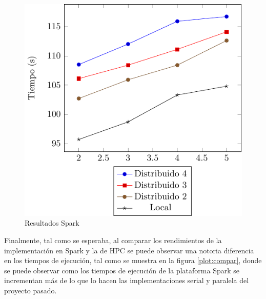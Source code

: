 \documentclass[conference,compsoc]{IEEEtran}
\begin{document}
\begin{figure}[H]
    \centering
    \includegraphics[scale=1]{ResultsSpark.pdf}
    \caption{Resultados Spark}
    \label{plot:spark}
\end{figure}

Finalmente, tal como se esperaba, al comparar los rendimientos de la implementación
en Spark y la de HPC se puede observar una notoria diferencia en los tiempos
de ejecución, tal como se muestra en la figura \ref{plot:compar}, donde se puede
observar como los tiempos de ejecución de la plataforma Spark se incrementan más
de lo que lo hacen las implementaciones serial y paralela del proyecto pasado.
\end{document}
